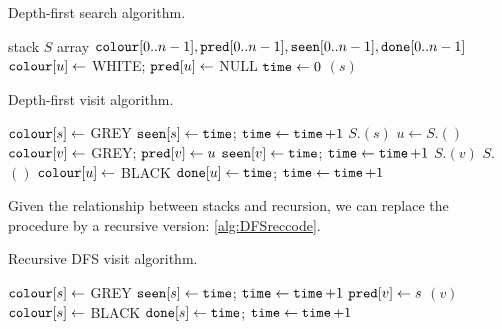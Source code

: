 \begin{algorithm}[H]
  \caption{Depth-first search algorithm.}
    \label{alg:DFScode}
\begin{algorithmic}[1]
	\State stack $S$  
	\State array $\colour[0..n-1], \pred[0..n-1], \seen[0..n-1], \done[0..n-1]$
		\State $\colour[u] \gets $ WHITE; $\pred[u] \gets $ NULL
	\EndFor
	\State $\timeVar \gets 0$
			\State {}$(s)$
		\EndIf
	\EndFor
	\State \Return{$\pred, \seen, \done$}
\EndFunction
\end{algorithmic}
\end{algorithm}

\begin{algorithm}[H]
  \caption{Depth-first visit algorithm.}
    \label{alg:DFSvisitcode}
\begin{algorithmic}[1]
	\State $\colour[s] \gets $ GREY
	\State $\seen[s] \gets \timeVar$; $\timeVar \gets \timeVar + 1$
	\State $S$.$(s)$
		\State $u \gets S$.$()$
			\State $\colour[v] \gets $ GREY; $\pred[v] \gets u$
			\State $\seen[v] \gets \timeVar$; $\timeVar \gets \timeVar + 1$
			\State $S$.$(v)$
		\Else
			\State $S$.$()$
			\State $\colour[u] \gets $ BLACK
			\State $\done[u] \gets \timeVar$; $\timeVar \gets \timeVar + 1$
		\EndIf
	\EndWhile
\EndFunction
\end{algorithmic}
\end{algorithm}


Given the relationship between stacks and recursion, we can replace the  procedure by
a recursive version: \cref{alg:DFSreccode}.

\begin{algorithm}[H]
  \caption{Recursive DFS visit algorithm.}
    \label{alg:DFSreccode}
\begin{algorithmic}[1]
	\State $\colour[s] \gets $ GREY
	\State $\seen[s] \gets \timeVar$; $\timeVar \gets \timeVar + 1$
			\State $\pred[v] \gets s$
			\State {}$(v)$ 
		\EndIf
	\EndFor
	\State $\colour[s] \gets $ BLACK
	\State $\done[s] \gets \timeVar $; $\timeVar \gets \timeVar + 1$
\EndFunction
\end{algorithmic}
\end{algorithm}

